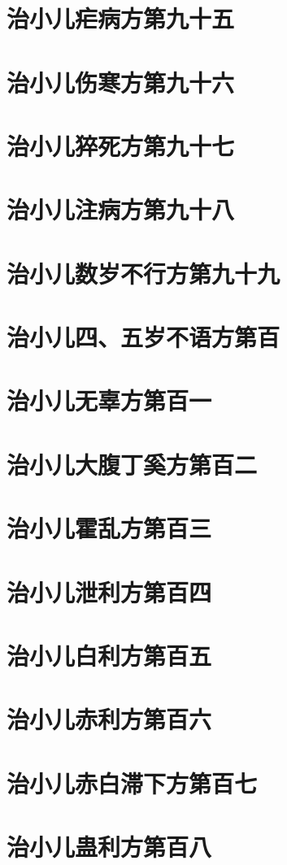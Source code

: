 \documentclass[a4paper,12pt,UTF8,twoside]{ctexbook}
\begin{document}
\chapter{治小儿疟病方第九十五}
\chapter{治小儿伤寒方第九十六}
\chapter{治小儿猝死方第九十七}
\chapter{治小儿注病方第九十八}
\chapter{治小儿数岁不行方第九十九}
\chapter{治小儿四、五岁不语方第百}
\chapter{治小儿无辜方第百一}
\chapter{治小儿大腹丁奚方第百二}
\chapter{治小儿霍乱方第百三}
\chapter{治小儿泄利方第百四}
\chapter{治小儿白利方第百五}
\chapter{治小儿赤利方第百六}
\chapter{治小儿赤白滞下方第百七}
\chapter{治小儿蛊利方第百八}
\end{document}
